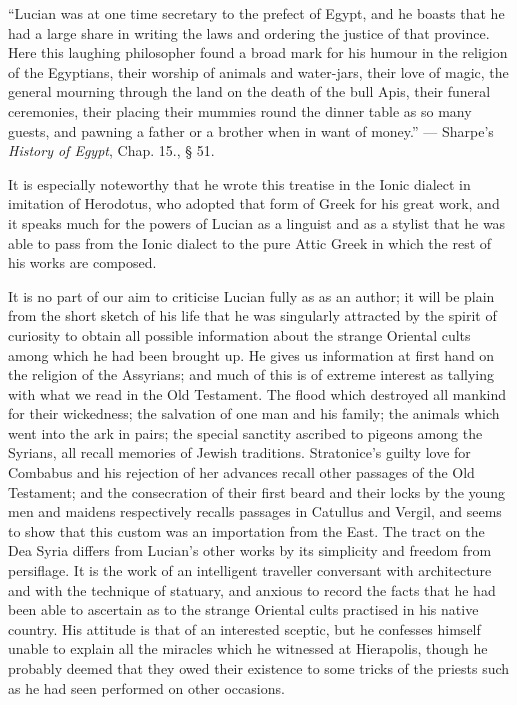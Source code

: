 \documentclass[a4paper, 11pt, oneside, polutonikogreek, english]{article}
\begin{document}
``Lucian was at one time secretary to the prefect of Egypt, and he boasts that he had a large share in writing the laws and ordering the justice of that province. Here this laughing philosopher found a broad mark for his humour in the religion of the Egyptians, their worship of animals and water-jars, their love of magic, the general mourning through the land on the death of the bull Apis, their funeral ceremonies, their placing their mummies round the dinner table as so many guests, and pawning a father or a brother when in want of money.'' --- Sharpe's \emph{History of Egypt}, Chap. 15., § 51.

It is especially noteworthy that he wrote this treatise in the Ionic dialect in imitation of Herodotus, who adopted that form of Greek for his great work, and it speaks much for the powers of Lucian as a linguist and as a stylist that he was able to pass from the Ionic dialect to the pure Attic Greek in which the rest of his works are composed.

It is no part of our aim to criticise Lucian fully as as an author; it will be plain from the short sketch of his life that he was singularly attracted by the spirit of curiosity to obtain all possible information about the strange Oriental cults among which he had been brought up. He gives us information at first hand on the religion of the Assyrians; and much of this is of extreme interest as tallying with what we read in the Old Testament. The flood which destroyed all mankind for their wickedness; the salvation of one man and his family; the animals which went into the ark in pairs; the special sanctity ascribed to pigeons among the Syrians, all recall memories of Jewish traditions. Stratonice's guilty love for Combabus and his rejection of her advances recall other passages of the Old Testament; and the consecration of their first beard and their locks by the young men and maidens respectively recalls passages in Catullus and Vergil, and seems to show that this custom was an importation from the East. The tract on the Dea Syria differs from Lucian's other works by its simplicity and freedom from persiflage. It is the work of an intelligent traveller conversant with architecture and with the technique of statuary, and anxious to record the facts that he had been able to ascertain as to the strange Oriental cults practised in his native country. His attitude is that of an interested sceptic, but he confesses himself unable to explain all the miracles which he witnessed at Hierapolis, though he probably deemed that they owed their existence to some tricks of the priests such as he had seen performed on other occasions.
\end{document}

